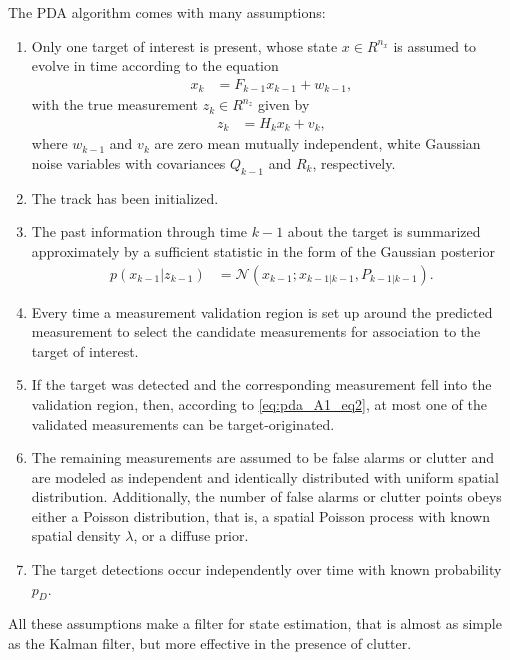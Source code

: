 The PDA algorithm comes with many assumptions:
\begin{enumerate}
    \item Only one target of interest is present, whose state $x \in R^{n_x}$ is assumed to evolve in time according to the equation
        \begin{align}
            x_k &= F_{k-1} x_{k-1} + w_{k-1},
        \end{align}
        with the true measurement $z_k \in R^{n_z}$ given by
        \begin{align}
            \label{eq:pda_A1_eq2}
            z_k &= H_k x_k + v_k,
        \end{align}
        where $w_{k-1}$ and $v_k$ are zero mean mutually independent, white Gaussian noise variables with covariances $Q_{k-1}$ and $R_k$, respectively.
    \item The track has been initialized.
    \item The past information through time $k-1$ about the target is summarized approximately by a sufficient statistic in the form of the Gaussian posterior
        \begin{align}
            p(x_{k-1}|z_{k-1}) &= \mathcal{N}(x_{k-1}; x_{k-1|k-1}, P_{k-1|k-1}). \label{eq:pda_A3}
        \end{align}
    \item Every time a measurement validation region is set up around the predicted measurement to select the candidate measurements for association to the target of interest.
    \item If the target was detected and the corresponding
    measurement fell into the validation region, then,
    according to \eqref{eq:pda_A1_eq2}, at most one of the validated measurements can be target-originated.
    \item The remaining measurements are assumed to be false alarms or clutter and are modeled as independent and identically distributed with uniform spatial distribution. Additionally, the number of false alarms or clutter points obeys either a Poisson distribution, that is, a spatial Poisson process with known
    spatial density $\lambda$, or \linebreak a diffuse prior.
    \item The target detections occur independently over time
    with known probability $p_D$.
\end{enumerate}
All these assumptions make a filter for state estimation, that is almost as simple as the Kalman filter, but more effective in the presence of clutter.

